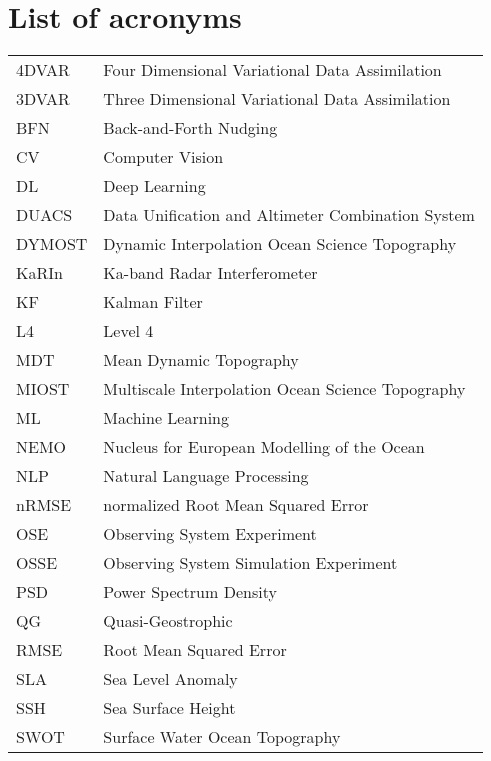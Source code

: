 \chapter*{List of acronyms}


\begin{tabular}{ll}
4DVAR & Four Dimensional Variational Data Assimilation\\
3DVAR & Three Dimensional Variational Data Assimilation\\
BFN & Back-and-Forth Nudging\\
CV  & Computer Vision\\
DL & Deep Learning \\
DUACS & Data Unification and Altimeter Combination System\\
DYMOST & Dynamic Interpolation Ocean Science Topography\\
KaRIn & Ka-band Radar Interferometer\\
KF & Kalman Filter \\
L4 & Level 4\\
MDT & Mean Dynamic Topography\\
MIOST & Multiscale Interpolation Ocean Science Topography\\
ML & Machine Learning\\
NEMO & Nucleus for European Modelling of the Ocean\\
NLP &  Natural Language Processing\\
nRMSE & normalized Root Mean Squared Error\\
OSE  & Observing System Experiment\\
OSSE  & Observing System Simulation Experiment\\
PSD & Power Spectrum Density\\
QG & Quasi-Geostrophic\\
RMSE & Root Mean Squared Error\\
SLA & Sea Level Anomaly\\
SSH & Sea Surface Height\\
SWOT &  Surface Water Ocean Topography \\



\end{tabular}
